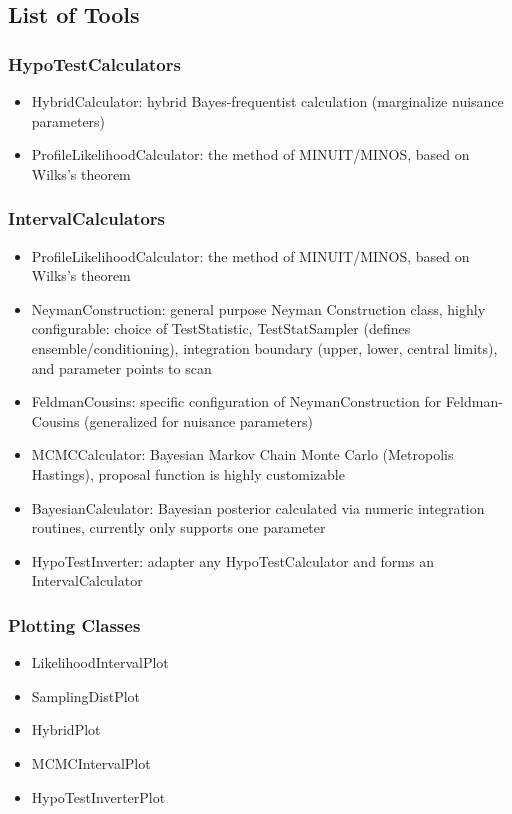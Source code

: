 \documentclass[11pt]{article}
\begin{document}
\subsection{List of Tools}

\subsubsection{HypoTestCalculators}
\begin{itemize}
 \item HybridCalculator: hybrid Bayes-frequentist calculation (marginalize nuisance parameters)
 \item ProfileLikelihoodCalculator: the method of MINUIT/MINOS, based on Wilks's theorem 
\end{itemize}

\subsubsection{IntervalCalculators}
\begin{itemize}
  \item ProfileLikelihoodCalculator: the method of MINUIT/MINOS, based on Wilks's theorem
 \item NeymanConstruction: general purpose Neyman Construction class, highly configurable: choice of TestStatistic, TestStatSampler (defines ensemble/conditioning), integration boundary (upper, lower, central limits), and parameter points to scan
 \item FeldmanCousins: specific configuration of NeymanConstruction for Feldman-Cousins (generalized for nuisance parameters)

 \item MCMCCalculator: Bayesian Markov Chain Monte Carlo (Metropolis Hastings), proposal function is highly customizable

 \item BayesianCalculator: Bayesian posterior calculated via numeric integration routines, currently only supports one parameter 

 \item HypoTestInverter: adapter any HypoTestCalculator and forms an IntervalCalculator
\end{itemize}

\subsubsection{Plotting Classes}
\begin{itemize}
 \item LikelihoodIntervalPlot
 \item SamplingDistPlot
 \item HybridPlot
 \item MCMCIntervalPlot
 \item HypoTestInverterPlot
\end{itemize}
\end{document}

